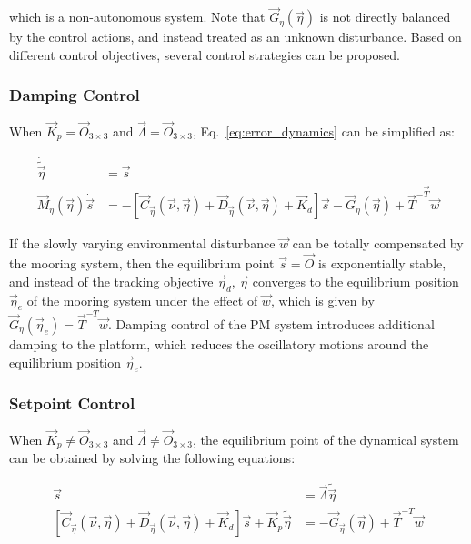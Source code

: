 \begin{sloppypar}
\noindent which is a non-autonomous system. Note that $\vec{G}_{\eta}(\vec{\eta})$ is not directly balanced by the control actions, and instead treated as an unknown disturbance. Based on different control objectives, several control strategies can be proposed.

\subsubsection{Damping Control}
When $\vec{K}_p = \vec{O}_{3\times3}$ and $\vec{\Lambda} = \vec{O}_{3\times3}$, Eq.~\ref{eq:error_dynamics} can be simplified as:

\begin{align}
\dot{\widetilde{\vec{\eta}}} &= \vec{s} \\
\vec{M}_{\eta}(\vec{\eta})\dot{\vec{s}} &= -\left[ \vec{C}_{\vec{\eta}}(\vec{\nu}, \vec{\eta}) + \vec{D}_{\vec{\eta}}(\vec{\nu}, \vec{\eta}) + \vec{K}_d \right] \vec{s} - \vec{G}_{\eta}(\vec{\eta}) + \vec{T}^{-\vec{T}}\vec{w}
\end{align}

If the slowly varying environmental disturbance $\vec{w}$ can be totally compensated by the mooring system, then the equilibrium point $\vec{s} = \vec{O}$ is exponentially stable, and instead of the tracking objective $\vec{\eta}_d$, $\vec{\eta}$ converges to the equilibrium position $\vec{\eta}_e$ of the mooring system under the effect of $\vec{w}$, which is given by $\vec{G}_{\eta}(\vec{\eta}_e) = \vec{T}^{-T}\vec{w}$. Damping control of the PM system introduces additional damping to the platform, which reduces the oscillatory motions around the equilibrium position $\vec{\eta}_e$.

\subsubsection{Setpoint Control}
When $\vec{K}_p \neq \vec{O}_{3\times3}$ and $\vec{\Lambda} \neq \vec{O}_{3\times3}$, the equilibrium point of the dynamical system can be obtained by solving the following equations:

\begin{align}
\vec{s} &= \vec{\Lambda}\widetilde{\vec{\eta}}\\
\left[ \vec{C}_{\vec{\eta}}(\vec{\nu}, \vec{\eta}) + \vec{D}_{\vec{\eta}}(\vec{\nu}, \vec{\eta}) + \vec{K}_d \right]\vec{s} + \vec{K}_p\widetilde{\vec{\eta}} &=  - \vec{G}_{\vec{\eta}}(\vec{\eta}) + \vec{T}^{-T}\vec{w}
\end{align}


\end{sloppypar}
